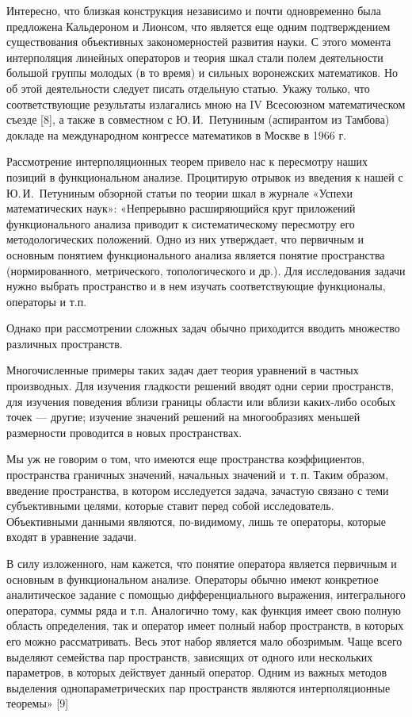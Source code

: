 Интересно, что близкая конструкция независимо и почти одновременно была предложена Кальдероном и Лионсом, что является еще одним подтверждением существования объективных закономерностей развития науки. С этого момента интерполяция линейных операторов и теория шкал стали полем деятельности большой группы молодых (в то время) и сильных воронежских математиков. Но об этой деятельности следует писать отдельную статью. Укажу только, что соответствующие результаты излагались мною на IV Всесоюзном математическом съезде [8], а также в совместном с Ю.\,И.~Петуниным (аспирантом из Тамбова) докладе на международном конгрессе математиков в Москве в 1966 г.

Рассмотрение интерполяционных теорем привело нас к пересмотру наших позиций в функциональном анализе.
\linebreak
Процитирую отрывок из введения к нашей с Ю.\,И.~Петуниным обзорной статьи по теории шкал в журнале
«Успехи математических наук»:
«Непрерывно расширяющийся круг приложений функционального анализа приводит к систематическому пересмотру его методологических положений. Одно из них утверждает, что первичным и основным понятием функционального анализа является понятие пространства (нормированного, метрического, топологического и др.). Для исследования задачи нужно выбрать пространство и в нем изучать соответствующие функционалы, операторы и т.п.

Однако при рассмотрении сложных задач обычно приходится вводить множество различных пространств.

Многочисленные примеры таких задач дает теория уравнений в частных производных. Для изучения гладкости решений вводят одни серии пространств, для изучения поведения вблизи границы области или вблизи каких-либо особых точек --- другие; изучение значений решений на многообразиях меньшей размерности проводится в новых пространствах.

Мы уж не говорим о том, что имеются еще пространства коэффициентов,
пространства граничных значений, начальных значений и~т.\,п.
Таким образом, введение пространства, в котором исследуется задача, зачастую связано с теми су\-бъ\-е\-к\-ти\-в\-ны\-ми целями, которые ставит перед собой исследователь. Объективными данными являются, по-видимому, лишь те операторы, которые входят в уравнение задачи.

В силу изложенного, нам кажется, что понятие оператора является первичным и основным в функциональном анализе. Операторы обычно имеют конкретное аналитическое задание с помощью дифференциального выражения, интегрального оператора, суммы ряда и т.п. Аналогично тому, как функция имеет свою полную область определения, так и оператор имеет полный набор пространств, в которых его можно рассматривать. Весь этот набор является мало обозримым. Чаще всего выделяют семейства пар пространств, зависящих от одного или нескольких параметров, в которых действует данный оператор. Одним из важных методов выделения однопараметрических пар пространств являются интерполяционные теоремы» [9]

